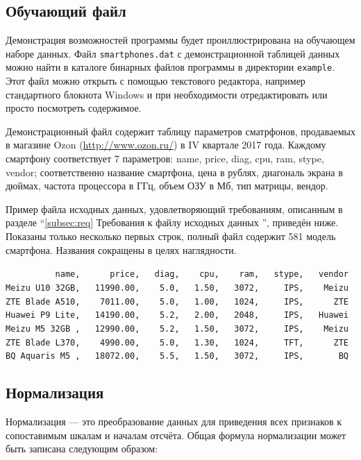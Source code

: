 \documentclass[12pt]{instruction}
\begin{document}
\subsection{Обучающий файл}
\label{subsec:trainfile}

Демонстрация возможностей программы будет проиллюстрирована на обучающем наборе данных. Файл \texttt{smartphones.dat} с демонстрационной таблицей данных можно найти в каталоге бинарных файлов программы в директории \texttt{example}. Этот файл можно открыть с помощью текстового редактора, например стандартного блокнота Windows и при необходимости отредактировать или просто посмотреть содержимое. 

Демонстрационный файл содержит таблицу параметров сматрфонов, продаваемых в магазине Ozon (\url{http://www.ozon.ru/}) в IV квартале 2017 года. Каждому смартфону соответствует 7 параметров: name, price, diag, cpu, ram, stype, vendor; соответственно название смартфона, цена в рублях, диагональ экрана в дюймах, частота процессора в ГГц, объем ОЗУ в Мб, тип матрицы, вендор.

Пример файла исходных данных, удовлетворяющий требованиям, описанным в разделе ``\ref{subsec:req} Требования к файлу исходных данных '', приведён ниже. Показаны только несколько первых строк, полный файл содержит 581 модель смартфона. Названия сокращены в целях наглядности.

\begin{tcolorbox}[colframe=black!50!black,coltext=black!25!black,colback=white,title=\textbf{Пример файла входных данных \texttt{data.csv}}]
	\verb|          name,      price,   diag,    cpu,    ram,   stype,   vendor |\\
	\verb|Meizu U10 32GB,   11990.00,    5.0,   1.50,   3072,     IPS,    Meizu |\\
	\verb|ZTE Blade A510,    7011.00,    5.0,   1.00,   1024,     IPS,      ZTE |\\
	\verb|Huawei P9 Lite,   14190.00,    5.2,   2.00,   2048,     IPS,   Huawei |\\
	\verb|Meizu M5 32GB ,   12990.00,    5.2,   1.50,   3072,     IPS,    Meizu |\\
	\verb|ZTE Blade L370,    4990.00,    5.0,   1.30,   1024,     TFT,      ZTE |\\
	\verb|BQ Aquaris M5 ,   18072.00,    5.5,   1.50,   3072,     IPS,       BQ |\\	
\end{tcolorbox}

\subsection{Нормализация}
\label{subsec:norm}
Нормализация --- это преобразование данных для приведения всех признаков к сопоставимым шкалам и началам отсчёта. Общая формула нормализации может быть записана следующим образом:
\end{document}
